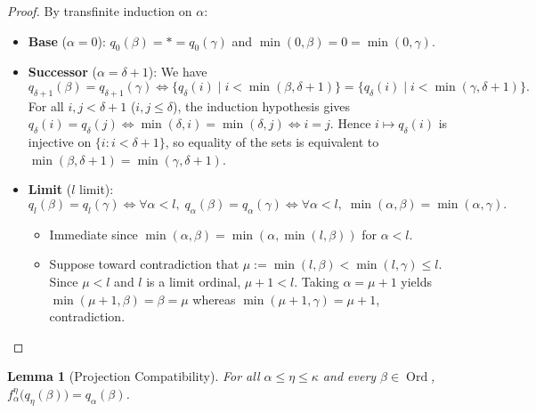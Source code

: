 \documentclass[11pt,a4paper]{article}
\theoremstyle{definition}
\theoremstyle{plain}
\newtheorem{lemma}[definition]{Lemma}
\newcommand{\Ord}{\operatorname{Ord}}
\begin{document}
\begin{proof}
By transfinite induction on $\alpha$:
\begin{itemize}[leftmargin=2em]
  \item \textbf{Base} ($\alpha = 0$): $q_0(\beta) = * = q_0(\gamma)$ and $\min(0, \beta) = 0 = \min(0, \gamma)$.
  \item \textbf{Successor} ($\alpha = \delta + 1$): We have
    \[
      q_{\delta+1}(\beta) = q_{\delta+1}(\gamma) \iff \bigl\{q_\delta(i) \mid i < \min(\beta, \delta+1)\bigr\} = \bigl\{q_\delta(i) \mid i < \min(\gamma, \delta+1)\bigr\}.
    \]
    For all $i, j < \delta + 1$ ($i, j \le \delta$), the induction hypothesis gives $q_\delta(i) = q_\delta(j) \iff \min(\delta, i) = \min(\delta, j) \iff i = j$. Hence $i \mapsto q_\delta(i)$ is injective on $\{i : i < \delta + 1\}$, so equality of the sets is equivalent to $\min(\beta, \delta+1) = \min(\gamma, \delta+1)$.
  \item \textbf{Limit} ($l$ limit):
    \[
      q_l(\beta) = q_l(\gamma) \iff \forall \alpha < l,\; q_\alpha(\beta) = q_\alpha(\gamma) \iff \forall \alpha < l,\; \min(\alpha, \beta) = \min(\alpha, \gamma).
    \]
    \begin{itemize}
      \item[($\Leftarrow$)] Immediate since $\min(\alpha, \beta) = \min(\alpha, \min(l, \beta))$ for $\alpha < l$.
      \item[($\Rightarrow$)] Suppose toward contradiction that $\mu := \min(l, \beta) < \min(l, \gamma) \le l$. Since $\mu < l$ and $l$ is a limit ordinal, $\mu + 1 < l$. Taking $\alpha = \mu + 1$ yields $\min(\mu+1, \beta) = \beta = \mu$ whereas $\min(\mu+1, \gamma) = \mu + 1$, contradiction. \qedhere
    \end{itemize}
\end{itemize}
\end{proof}

\begin{lemma}[Projection Compatibility]
For all $\alpha \le \eta \le \kappa$ and every $\beta \in \Ord$, $f_\alpha^\eta\bigl(q_\eta(\beta)\bigr) = q_\alpha(\beta)$.
\end{lemma}
\end{document}
